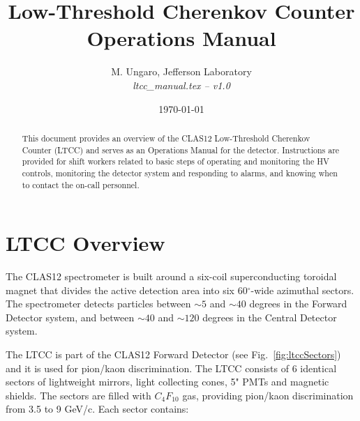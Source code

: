 \documentclass{article}
\begin{document}
\title{Low-Threshold Cherenkov Counter Operations Manual}

\vskip 1cm

\author{M. Ungaro, Jefferson Laboratory\\[0.2ex]
{\it ltcc\_manual.tex -- v1.0}}

\date \today
%
\maketitle

\begin{abstract}
This document provides an overview of the CLAS12 Low-Threshold Cherenkov Counter (LTCC) and serves 
as an Operations Manual for the detector. Instructions are provided for shift workers related to 
basic steps of operating and monitoring the HV controls, monitoring the detector system and 
responding to alarms, and knowing when to contact the on-call personnel. 

%

\end{abstract}

\thispagestyle{empty}


\tableofcontents

\clearpage

\section{LTCC Overview}
\label{intro}

The CLAS12 spectrometer is built around a six-coil superconducting toroidal magnet that divides the 
active detection area into six 60$^\circ$-wide azimuthal sectors. 
The spectrometer detects particles between $\sim 5$ and $\sim 40$ degrees in the Forward Detector system, and
between $\sim 40$ and $\sim 120$ degrees in the Central Detector system.

The LTCC is part of the CLAS12 Forward Detector (see Fig.~\ref{fig:ltccSectors}) and it is used for  pion/kaon discrimination. 
The LTCC consists of 6 identical sectors of lightweight mirrors, light collecting cones, 5" PMTs and magnetic shields. 
The sectors are filled with $C_4F_{10}$ gas, providing pion/kaon discrimination from 3.5 to 9 GeV/c. 
Each sector contains:
\end{document}
